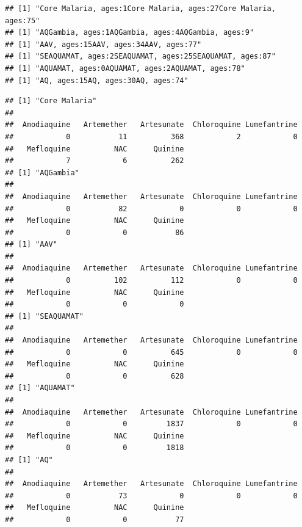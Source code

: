 \documentclass[]{article}
\newenvironment{Shaded}{\begin{snugshade}}{\end{snugshade}}
\newcommand{\KeywordTok}[1]{\textcolor[rgb]{0.13,0.29,0.53}{\textbf{#1}}}
\newcommand{\ControlFlowTok}[1]{\textcolor[rgb]{0.13,0.29,0.53}{\textbf{#1}}}
\newcommand{\OperatorTok}[1]{\textcolor[rgb]{0.81,0.36,0.00}{\textbf{#1}}}
\newcommand{\NormalTok}[1]{#1}
\begin{document}
\begin{verbatim}
## [1] "Core Malaria, ages:1Core Malaria, ages:27Core Malaria, ages:75"
## [1] "AQGambia, ages:1AQGambia, ages:4AQGambia, ages:9"
## [1] "AAV, ages:15AAV, ages:34AAV, ages:77"
## [1] "SEAQUAMAT, ages:2SEAQUAMAT, ages:25SEAQUAMAT, ages:87"
## [1] "AQUAMAT, ages:0AQUAMAT, ages:2AQUAMAT, ages:78"
## [1] "AQ, ages:15AQ, ages:30AQ, ages:74"
\end{verbatim}

\begin{Shaded}
\end{Shaded}

\begin{verbatim}
## [1] "Core Malaria"
## 
##  Amodiaquine   Artemether   Artesunate  Chloroquine Lumefantrine 
##            0           11          368            2            0 
##   Mefloquine          NAC      Quinine 
##            7            6          262 
## [1] "AQGambia"
## 
##  Amodiaquine   Artemether   Artesunate  Chloroquine Lumefantrine 
##            0           82            0            0            0 
##   Mefloquine          NAC      Quinine 
##            0            0           86 
## [1] "AAV"
## 
##  Amodiaquine   Artemether   Artesunate  Chloroquine Lumefantrine 
##            0          102          112            0            0 
##   Mefloquine          NAC      Quinine 
##            0            0            0 
## [1] "SEAQUAMAT"
## 
##  Amodiaquine   Artemether   Artesunate  Chloroquine Lumefantrine 
##            0            0          645            0            0 
##   Mefloquine          NAC      Quinine 
##            0            0          628 
## [1] "AQUAMAT"
## 
##  Amodiaquine   Artemether   Artesunate  Chloroquine Lumefantrine 
##            0            0         1837            0            0 
##   Mefloquine          NAC      Quinine 
##            0            0         1818 
## [1] "AQ"
## 
##  Amodiaquine   Artemether   Artesunate  Chloroquine Lumefantrine 
##            0           73            0            0            0 
##   Mefloquine          NAC      Quinine 
##            0            0           77
\end{verbatim}
\end{document}
